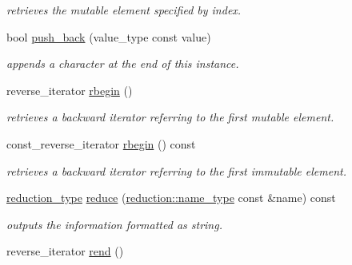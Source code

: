 \begin{DoxyCompactItemize}
\begin{DoxyCompactList}\small\item\em retrieves the mutable element specified by index. \end{DoxyCompactList}\item 
\hypertarget{classhryky_1_1_string_a0e5eea4617e8a71510a1e34958b0d189}{bool \hyperlink{classhryky_1_1_string_a0e5eea4617e8a71510a1e34958b0d189}{push\-\_\-back} (value\-\_\-type const value)}\label{classhryky_1_1_string_a0e5eea4617e8a71510a1e34958b0d189}

\begin{DoxyCompactList}\small\item\em appends a character at the end of this instance. \end{DoxyCompactList}\item 
\hypertarget{classhryky_1_1_string_a75e1d03284fd701283768e1b5230110c}{reverse\-\_\-iterator \hyperlink{classhryky_1_1_string_a75e1d03284fd701283768e1b5230110c}{rbegin} ()}\label{classhryky_1_1_string_a75e1d03284fd701283768e1b5230110c}

\begin{DoxyCompactList}\small\item\em retrieves a backward iterator referring to the first mutable element. \end{DoxyCompactList}\item 
\hypertarget{classhryky_1_1_string_abb559a42c1e0a454222fd4d9be47b5da}{const\-\_\-reverse\-\_\-iterator \hyperlink{classhryky_1_1_string_abb559a42c1e0a454222fd4d9be47b5da}{rbegin} () const }\label{classhryky_1_1_string_abb559a42c1e0a454222fd4d9be47b5da}

\begin{DoxyCompactList}\small\item\em retrieves a backward iterator referring to the first immutable element. \end{DoxyCompactList}\item 
\hypertarget{classhryky_1_1_string_a03adae56f3604b70e4cf17c8473c667a}{\hyperlink{namespacehryky_a343a9a4c36a586be5c2693156200eadc}{reduction\-\_\-type} \hyperlink{classhryky_1_1_string_a03adae56f3604b70e4cf17c8473c667a}{reduce} (\hyperlink{namespacehryky_1_1reduction_ac686c30a4c8d196bbd0f05629a6b921f}{reduction\-::name\-\_\-type} const \&name) const }\label{classhryky_1_1_string_a03adae56f3604b70e4cf17c8473c667a}

\begin{DoxyCompactList}\small\item\em outputs the information formatted as string. \end{DoxyCompactList}\item 
\hypertarget{classhryky_1_1_string_a644a4328ebf32a38022c10c7dc02bee5}{reverse\-\_\-iterator \hyperlink{classhryky_1_1_string_a644a4328ebf32a38022c10c7dc02bee5}{rend} ()}\label{classhryky_1_1_string_a644a4328ebf32a38022c10c7dc02bee5}


\end{DoxyCompactItemize}
